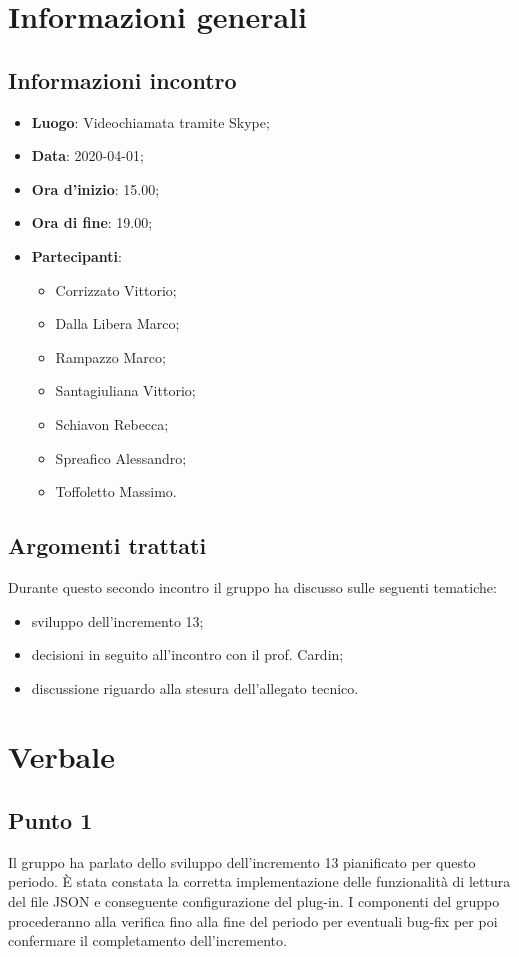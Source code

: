 \section{Informazioni generali}
    \subsection{Informazioni incontro}
        \begin{itemize}
            \item \textbf{Luogo}: Videochiamata tramite Skype;
            \item \textbf{Data}: 2020-04-01;
            \item \textbf{Ora d'inizio}: 15.00;
            \item \textbf{Ora di fine}: 19.00;
            \item \textbf{Partecipanti}: \begin{itemize}
                \item Corrizzato Vittorio;
                \item Dalla Libera Marco;
                \item Rampazzo Marco;
                \item Santagiuliana Vittorio;
                \item Schiavon Rebecca;
                \item Spreafico Alessandro;
                \item Toffoletto Massimo.
            \end{itemize}
        \end{itemize}
    \subsection{Argomenti trattati}
        Durante questo secondo incontro il gruppo ha discusso sulle seguenti tematiche:
        \begin{itemize}
            \item sviluppo dell'incremento 13;
            \item decisioni in seguito all'incontro con il prof. Cardin;
            \item discussione riguardo alla stesura dell'allegato tecnico.
        \end{itemize}
\section{Verbale}
    \subsection{Punto 1}
        Il gruppo ha parlato dello sviluppo dell'incremento 13 pianificato per questo periodo. È stata constata la corretta implementazione delle funzionalità di lettura del file JSON e conseguente configurazione del plug-in. I componenti del gruppo procederanno alla verifica fino alla fine del periodo per eventuali bug-fix per poi confermare il completamento dell'incremento.
